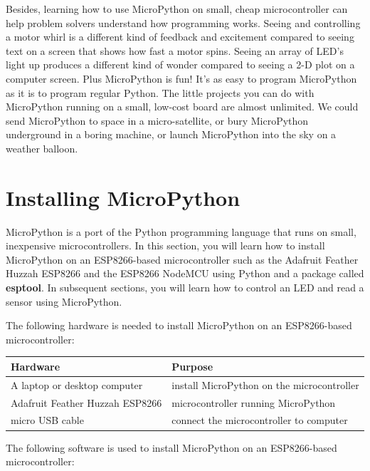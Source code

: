 \documentclass{book}
\begin{document}
Besides, learning how to use MicroPython on small, cheap microcontroller
can help problem solvers understand how programming works. Seeing and
controlling a motor whirl is a different kind of feedback and excitement
compared to seeing text on a screen that shows how fast a motor spins.
Seeing an array of LED's light up produces a different kind of wonder
compared to seeing a 2-D plot on a computer screen. Plus MicroPython is
fun! It's as easy to program MicroPython as it is to program regular
Python. The little projects you can do with MicroPython running on a
small, low-cost board are almost unlimited. We could send MicroPython to
space in a micro-satellite, or bury MicroPython underground in a boring
machine, or launch MicroPython into the sky on a weather balloon.
    




    
        \section{Installing MicroPython}\label{installing-micropython}
    




    
        MicroPython is a port of the Python programming language that runs on
small, inexpensive microcontrollers. In this section, you will learn how
to install MicroPython on an ESP8266-based microcontroller such as the
Adafruit Feather Huzzah ESP8266 and the ESP8266 NodeMCU using Python and
a package called \textbf{esptool}. In subsequent sections, you will
learn how to control an LED and read a sensor using MicroPython.
    




    
        The following hardware is needed to install MicroPython on an
ESP8266-based microcontroller:

\begin{longtable}[]{@{}ll@{}}
\toprule
Hardware & Purpose\tabularnewline
\midrule
\endhead
A laptop or desktop computer & install MicroPython on the
microcontroller\tabularnewline
Adafruit Feather Huzzah ESP8266 & microcontroller running
MicroPython\tabularnewline
micro USB cable & connect the microcontroller to computer\tabularnewline
\bottomrule
\end{longtable}

The following software is used to install MicroPython on an
ESP8266-based microcontroller:
\end{document}
